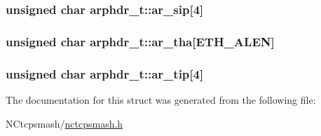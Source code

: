 \hypertarget{structarphdr__t_09417c9e01dfc51910916695bac5b48b}{
\subsubsection{\setlength{\rightskip}{0pt plus 5cm}unsigned char {\bf arphdr\_\-t::ar\_\-sip}\mbox{[}4\mbox{]}}}
\label{structarphdr__t_09417c9e01dfc51910916695bac5b48b}


\hypertarget{structarphdr__t_03ae5c4ed9bdd8cc59930d4333c16ae1}{
\subsubsection{\setlength{\rightskip}{0pt plus 5cm}unsigned char {\bf arphdr\_\-t::ar\_\-tha}\mbox{[}ETH\_\-ALEN\mbox{]}}}
\label{structarphdr__t_03ae5c4ed9bdd8cc59930d4333c16ae1}


\hypertarget{structarphdr__t_4fcd057f375589d942fe53303927c6e7}{
\subsubsection{\setlength{\rightskip}{0pt plus 5cm}unsigned char {\bf arphdr\_\-t::ar\_\-tip}\mbox{[}4\mbox{]}}}
\label{structarphdr__t_4fcd057f375589d942fe53303927c6e7}




The documentation for this struct was generated from the following file:\begin{CompactItemize}
\item 
NCtcpsmash/\hyperlink{nctcpsmash_8h}{nctcpsmash.h}\end{CompactItemize}
